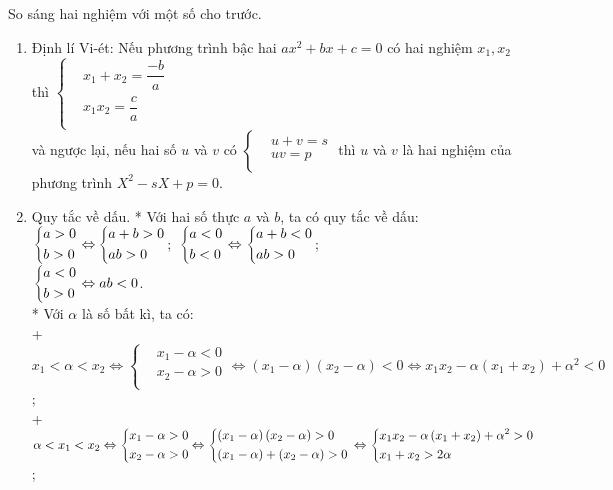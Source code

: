\begin{dang}{So sáng hai nghiệm với một số cho trước.}
	\begin{enumerate}
		\item Định lí Vi-ét: Nếu phương trình bậc hai $ax^2+bx+c=0$ có hai nghiệm $x_1,x_2$ thì $\left\{{\begin{aligned}&{x_1+x_2=\dfrac{-b}{a}} \\ &{x_1x_2=\dfrac{c}{a}} \\ \end{aligned}}\right.$ \\
		và ngược lại, nếu hai số $u$ và $v$ có $\left\{{\begin{aligned}&{u+v=s} \\ &{uv=p} \\ \end{aligned}}\right.$ thì $u$ và $v$ là hai nghiệm của phương trình $X^2-sX+p=0$.
		\item Quy tắc về dấu.
		* Với hai số thực $a$ và $b$, ta có quy tắc về dấu:\\
		${\left\{\begin{aligned}&a>0 \\ &b>0 \end{aligned}\right.\Leftrightarrow}\left\{\begin{aligned}&a+b>0 \\ &ab>0\end{aligned}\right.$;           $\\
		\left\{\begin{aligned}&a<0 \\ &b<0 \end{aligned}\right.\Leftrightarrow\left\{\begin{aligned}&a+b<0 \\ &ab>0\end{aligned}\right. $;  \\ 	$\left\{\begin{aligned}&a<0 \\ &b>0 \end{aligned}\right.\Leftrightarrow ab<0 $.\\
		* Với $\alpha$ là số bất kì, ta có:\\
		+ $x_1<\alpha <x_2\Leftrightarrow \left\{{\begin{aligned}&{x_1-\alpha <0} \\ &{x_2-\alpha >0} \\ \end{aligned}\Leftrightarrow \left({x_1-\alpha}\right)}\right.\left({x_2-\alpha}\right)<0\Leftrightarrow x_1x_2-\alpha \left({x_1+x_2}\right)+\alpha^2<0$;\\
		+ $\alpha <x_1<x_2\\\Leftrightarrow \left\{{\begin{aligned}&{x_1-\alpha >0} \\ &{x_2-\alpha >0} \\ \end{aligned}\\\Leftrightarrow \left\{{\begin{aligned}&{\left({x_1-\alpha}\right)\left({x_2-\alpha}\right)>0} \\ &{\left({x_1-\alpha}\right)+\left({x_2-\alpha}\right)>0} \\ \end{aligned}}\right.}\right.\Leftrightarrow \left\{{\begin{aligned}&{x_1x_2-\alpha \left({x_1+x_2}\right)+\alpha^2>0} \\ &{x_1+x_2>2\alpha} \\ \end{aligned}}\right.$;\\

\end{enumerate}
\end{dang}
